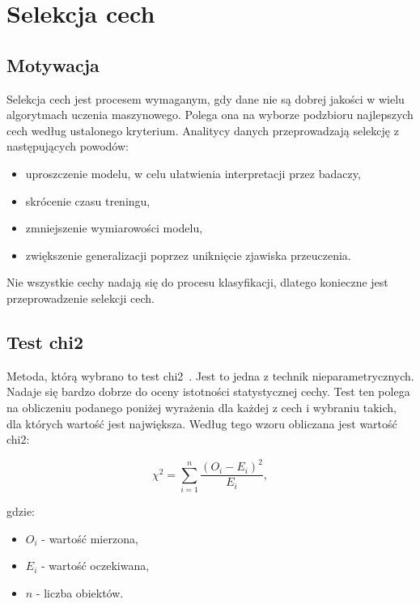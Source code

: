     \section{Selekcja cech}\label{sec:selekcjaCech}

    \subsection{Motywacja}\label{subsec:motywacja}

    Selekcja cech jest procesem wymaganym, gdy dane nie są dobrej jakości w wielu algorytmach uczenia maszynowego.
    Polega ona na wyborze podzbioru najlepszych cech według ustalonego kryterium.
    Analitycy danych przeprowadzają selekcję z następujących powodów:
    \begin{itemize}
        \item uproszczenie modelu, w celu ułatwienia interpretacji przez badaczy,
        \item skrócenie czasu treningu,
        \item zmniejszenie wymiarowości modelu,
        \item zwiększenie generalizacji poprzez uniknięcie zjawiska przeuczenia.
    \end{itemize}

    Nie wszystkie cechy nadają się do procesu klasyfikacji, dlatego konieczne jest przeprowadzenie selekcji cech.

    \subsection{Test chi2}\label{subsec:testChi2}

    Metoda, którą wybrano to test chi2~\cite{chi2}.
    Jest to jedna z technik nieparametrycznych.
    Nadaje się bardzo dobrze do oceny istotności statystycznej cechy.
    Test ten polega na obliczeniu podanego poniżej wyrażenia dla każdej z cech i wybraniu takich, dla których wartość jest największa.
    Według tego wzoru obliczana jest wartość chi2:

    \begin{equation}
        \chi ^ 2 = \sum_{i=1}^{n}{ \frac{{(O_i - E_i) ^ 2}}{E_i}},
    \end{equation}

    gdzie:
    \begin{itemize}
        \item $O_i$ - wartość mierzona,
        \item $E_i$ - wartość oczekiwana,
        \item $n$ - liczba obiektów.
    \end{itemize}

